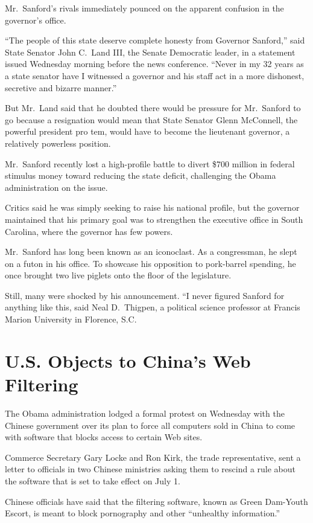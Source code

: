 ﻿\documentclass[12pt]{article}
\begin{document}
Mr.~Sanford's rivals immediately pounced on the apparent confusion in the governor's office.

``The people of this state deserve complete honesty from Governor Sanford,'' said State Senator John
C.~Land III, the Senate Democratic leader, in a statement issued Wednesday morning before the news
conference. ``Never in my 32 years as a state senator have I witnessed a governor and his staff act
in a more dishonest, secretive and bizarre manner.''

But Mr.~Land said that he doubted there would be pressure for Mr.~Sanford to go because a
resignation would mean that State Senator Glenn McConnell, the powerful president pro tem, would
have to become the lieutenant governor, a relatively powerless position.

Mr.~Sanford recently lost a high-profile battle to divert \$700 million in federal stimulus money
toward reducing the state deficit, challenging the Obama administration on the issue.

Critics said he was simply seeking to raise his national profile, but the governor maintained that
his primary goal was to strengthen the executive office in South Carolina, where the governor has
few powers.

Mr.~Sanford has long been known as an iconoclast. As a congressman, he slept on a futon in his
office. To showcase his opposition to pork-barrel spending, he once brought two live piglets onto
the floor of the legislature.

Still, many were shocked by his announcement. ``I never figured Sanford for anything like this, said
Neal D.~Thigpen, a political science professor at Francis Marion University in Florence, S.C.

\section{U.S. Objects to China's Web Filtering}

The Obama administration lodged a formal protest on Wednesday with the Chinese government over its
plan to force all computers sold in China to come with software that blocks access to certain Web
sites.

Commerce Secretary Gary Locke and Ron Kirk, the trade representative, sent a letter to officials in
two Chinese ministries asking them to rescind a rule about the software that is set to take effect
on July 1.

Chinese officials have said that the filtering software, known as Green Dam-Youth Escort, is meant
to block pornography and other ``unhealthy information.''
\end{document}
